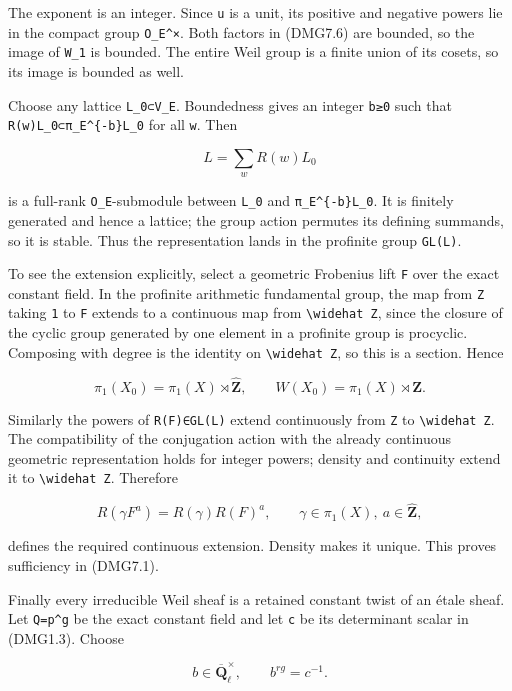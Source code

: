 \documentclass[
]{report}
\begin{document}
The exponent is an integer. Since \texttt{u} is a unit, its positive and
negative powers lie in the compact group \texttt{O\_E\^{}×}. Both
factors in (DMG7.6) are bounded, so the image of \texttt{W\_1} is
bounded. The entire Weil group is a finite union of its cosets, so its
image is bounded as well.

Choose any lattice \texttt{L\_0⊂V\_E}. Boundedness gives an integer
\texttt{b≥0} such that \texttt{R(w)L\_0⊂π\_E\^{}\{-b\}L\_0} for all
\texttt{w}. Then

\[
L=\sum_w R(w)L_0
\tag{DMG7.7}
\]

is a full-rank \texttt{O\_E}-submodule between \texttt{L\_0} and
\texttt{π\_E\^{}\{-b\}L\_0}. It is finitely generated and hence a
lattice; the group action permutes its defining summands, so it is
stable. Thus the representation lands in the profinite group
\texttt{GL(L)}.

To see the extension explicitly, select a geometric Frobenius lift
\texttt{F} over the exact constant field. In the profinite arithmetic
fundamental group, the map from \texttt{Z} taking \texttt{1} to
\texttt{F} extends to a continuous map from
\texttt{\textbackslash{}widehat\ Z}, since the closure of the cyclic
group generated by one element in a profinite group is procyclic.
Composing with degree is the identity on
\texttt{\textbackslash{}widehat\ Z}, so this is a section. Hence

\[
\pi_1(X_0)=\pi_1(X)\rtimes\widehat{\mathbf Z},
\qquad W(X_0)=\pi_1(X)\rtimes\mathbf Z.
\tag{DMG7.8}
\]

Similarly the powers of \texttt{R(F)∈GL(L)} extend continuously from
\texttt{Z} to \texttt{\textbackslash{}widehat\ Z}. The compatibility of
the conjugation action with the already continuous geometric
representation holds for integer powers; density and continuity extend
it to \texttt{\textbackslash{}widehat\ Z}. Therefore

\[
R(\gamma F^a)=R(\gamma)R(F)^a,
\qquad \gamma\in\pi_1(X),\ a\in\widehat{\mathbf Z},
\tag{DMG7.9}
\]

defines the required continuous extension. Density makes it unique. This
proves sufficiency in (DMG7.1).

Finally every irreducible Weil sheaf is a retained constant twist of an
étale sheaf. Let \texttt{Q=p\^{}g} be the exact constant field and let
\texttt{c} be its determinant scalar in (DMG1.3). Choose

\[
b\in\overline{\mathbf Q}_\ell^\times,
\qquad b^{rg}=c^{-1}.
\tag{DMG7.10}
\]
\end{document}
